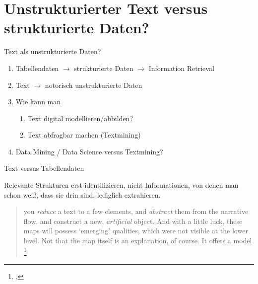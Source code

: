 

\section{Unstrukturierter Text versus strukturierte Daten?}


\begin{frame}{Text als unstrukturierte Daten?}
\begin{enumerate}
    \item Tabellendaten $\to$ strukturierte Daten $\to$ Information Retrieval
    \item Text $\to$ notorisch unstrukturierte Daten
    \item Wie kann man
    \begin{enumerate}
        \item Text digital modellieren/abbilden?
        \item Text abfragbar machen (Textmining)
    \end{enumerate}
    \item Data Mining / Data Science versus Textmining?
\end{enumerate}
    
\end{frame}

\begin{frame}{Text versus Tabellendaten}

Relevante Strukturen erst identifizieren, nicht Informationen, von denen man schon weiß, dass sie drin sind, lediglich extrahieren. 
\bigskip

\begin{block}{}
\begin{quote}\footnotesize
    \punkti you \emph{reduce} a text to a few elements, and \emph{abstract} them from the narrative flow, and construct a new, \emph{artificial} object. \punkti And with a little luck, these maps will \punkti possess `emerging' qualities, which were not visible at the lower level. \punkti Not that the map itself is an explanation, of course. It offers a model \punkti\footcite[53]{graphsmoretti} 
\end{quote}
\end{block}
\end{frame}

